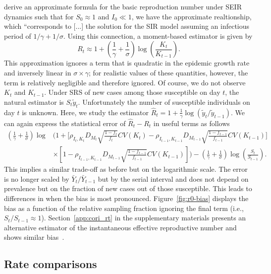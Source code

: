 \documentclass[11pt]{amsart}
\numberwithin{equation}{section}
\theoremstyle{plain}
\begin{document}
\cite{Heng2020} derive an approximate formula for the basic reproduction number under SEIR dynamics such that for $S_0 \approx 1$ and $I_0 \ll 1$, we have the approximate realtionship, which ``corresponds to [...] the solution for the SIR model assuming an infectious period of $1/\gamma + 1/\sigma$. Using this connection, a moment-based estimator is given by
$$
R_t \approx 1 + \left( \frac{1}{\gamma} + \frac{1}{\sigma} \right) \log \left( \frac{K_t}{K_{t-1}} \right).
$$
This approximation ignores a term that is quadratic in the epidemic growth rate and inversely linear in $\sigma \times \gamma$; for realistic values of these quantities, however, the term is relatively negligible and therefore ignored. Of course, we do not observe $K_t$ and $K_{t-1}$.  Under SRS of new cases among those susceptible on day $t$, the natural estimator is $S_t \tilde y_t$.  Unfortunately the number of susceptible individuals on day $t$ is unknown. Here, we study the estimator $\hat R_t = 1 + \frac{1}{\gamma} \log \left( \tilde y_t / \tilde y_{t-1} \right)$. We can again express the statistical error of $\hat R_t - R_t$ in useful terms as follows
 $$
 \begin{aligned}
 \left( \frac{1}{\gamma} + \frac{1}{\sigma} \right)\log &\bigg( 1 + \bigg[ \rho_{I_t,K_t} D_{M_t} \sqrt{\frac{1-f_t}{f_t}} CV (K_t)  -\rho_{I_{t-1},K_{t-1}} D_{M_{t-1}} \sqrt{\frac{1-f_{t-1}}{f_{t-1}}} CV (K_{t-1}) \bigg] \\
 &\times \left[ 1 - \rho_{I_{t-1},K_{t-1}} D_{M_{t-1}} \sqrt{\frac{1-f_{t-1}}{f_{t-1}}} CV (K_{t-1}) \right] \bigg) - \left( \frac{1}{\gamma} + \frac{1}{\sigma} \right) \log \left( \frac{S_t}{S_{t-1}} \right).
 \end{aligned}
 $$
 This implies a similar trade-off as before but on the logarithmic scale.  The error is no longer scaled by $\bar Y_t/\bar Y_{t-1}$ but by the serial interval and does not depend on prevalence but on the fraction of new cases out of those susceptible. This leads to differences in when the bias is most pronounced. Figure~\ref{fig:r0-bias} displays the bias as a function of the relative sampling fraction ignoring the final term (i.e., $S_t / S_{t-1} \approx 1$). Section~\ref{app:cori_rt} in the supplementary materials presents an alternative estimator of the instantaneous effective reproductive number and shows similar bias~\cite{Cori20113}.


 \subsection{Rate comparisons}
\end{document}
